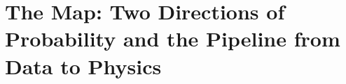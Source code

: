 \chapter{The Map: Two Directions of Probability and the Pipeline from Data to Physics}\label{ch:00}
\providecommand{\zeroaEx}[1]{\refstepcounter{wex}\paragraph*{Example~\thewex\ (#1).}}
\providecommand{\CoinPkFair}{}\renewcommand{\CoinPkFair}{0.04395}
\providecommand{\CoinPkBias}{}\renewcommand{\CoinPkBias}{0.302}
\providecommand{\CoinSimFair}{}\renewcommand{\CoinSimFair}{0.04105}
\providecommand{\CoinSimBias}{}\renewcommand{\CoinSimBias}{0.3024}
\providecommand{\CoinSimErr}{}\renewcommand{\CoinSimErr}{0.001449}
\providecommand{\CoinPostBias}{}\renewcommand{\CoinPostBias}{0.873}
\providecommand{\CoinPostBiasFive}{}\renewcommand{\CoinPostBiasFive}{0.09696}
\providecommand{\CoinLR}{}\renewcommand{\CoinLR}{6.872}
\providecommand{\CoinNexp}{}\renewcommand{\CoinNexp}{20000}
\providecommand{\QSdTen}{}\renewcommand{\QSdTen}{0.1267}
\providecommand{\QSdHundred}{}\renewcommand{\QSdHundred}{0.03997}
\providecommand{\QSdTenTh}{}\renewcommand{\QSdTenTh}{0.1265}
\providecommand{\QSdHundredTh}{}\renewcommand{\QSdHundredTh}{0.04}
\providecommand{\QMeanTen}{}\renewcommand{\QMeanTen}{0.7993}
\providecommand{\QPexact}{}\renewcommand{\QPexact}{0.05469}
\providecommand{\QPmcMillion}{}\renewcommand{\QPmcMillion}{0.0545}
\providecommand{\QSigmaMillion}{}\renewcommand{\QSigmaMillion}{2.274\times10^{-4}}
\providecommand{\QPmcHundred}{}\renewcommand{\QPmcHundred}{0.0566}
\providecommand{\QNhundred}{}\renewcommand{\QNhundred}{106}
\providecommand{\PipeMaxDiff}{}\renewcommand{\PipeMaxDiff}{3.469\times10^{-18}}
\providecommand{\PipeKTen}{}\renewcommand{\PipeKTen}{7}
\providecommand{\PipeSdTen}{}\renewcommand{\PipeSdTen}{0.1307}
\providecommand{\PipeSdThTen}{}\renewcommand{\PipeSdThTen}{0.1449}
\providecommand{\PipeKHundred}{}\renewcommand{\PipeKHundred}{76}
\providecommand{\PipeSdHundred}{}\renewcommand{\PipeSdHundred}{0.04238}
\providecommand{\PipeSdThHundred}{}\renewcommand{\PipeSdThHundred}{0.04271}
\providecommand{\PipeKThousand}{}\renewcommand{\PipeKThousand}{819}
\providecommand{\PipeSdThousand}{}\renewcommand{\PipeSdThousand}{0.01217}
\providecommand{\PipeSdThThousand}{}\renewcommand{\PipeSdThThousand}{0.01218}
\providecommand{\PipeSdExactTen}{}\renewcommand{\PipeSdExactTen}{0.131}
\providecommand{\SameVarA}{}\renewcommand{\SameVarA}{1}
\providecommand{\SameVarB}{}\renewcommand{\SameVarB}{1}
